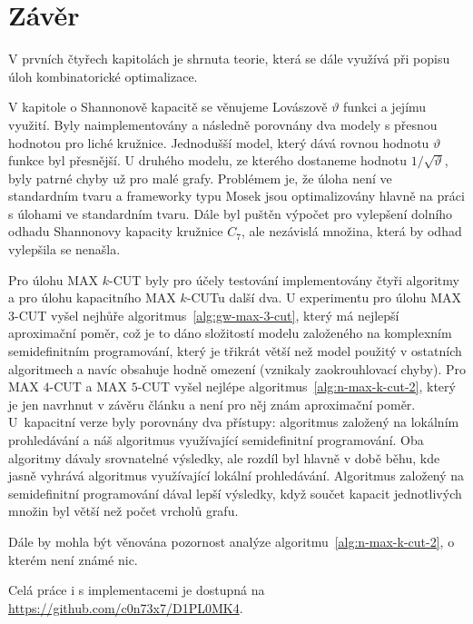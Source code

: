 \chapter*{Závěr}

V prvních čtyřech kapitolách je shrnuta teorie, která se dále využívá při popisu úloh kombinatorické optimalizace.

V kapitole o Shannonově kapacitě se věnujeme Lovászově $\vartheta$ funkci a jejímu využití. Byly naimplementovány a následně porovnány dva modely s přesnou hodnotou pro liché kružnice. Jednodušší model, který dává rovnou hodnotu $\vartheta$ funkce byl přesnější. U druhého modelu, ze kterého dostaneme hodnotu $1/\sqrt{\vartheta}$, byly patrné chyby už pro malé grafy. Problémem je, že úloha není ve standardním tvaru a frameworky typu Mosek jsou optimalizovány hlavně na práci s úlohami ve standardním tvaru. Dále byl puštěn výpočet pro vylepšení dolního odhadu Shannonovy kapacity kružnice $C_7$, ale nezávislá množina, která by odhad vylepšila se nenašla.

Pro úlohu MAX $k$-CUT byly pro účely testování implementovány čtyři algoritmy a pro úlohu kapacitního MAX $k$-CUTu další dva. U experimentu pro úlohu MAX $3$-CUT vyšel nejhůře algoritmus~\ref{alg:gw-max-3-cut}, který má nejlepší aproximační poměr, což je to dáno složitostí modelu založeného na komplexním semidefinitním programování, který je třikrát větší než model použitý v ostatních algoritmech a navíc obsahuje hodně omezení (vznikaly zaokrouhlovací chyby). Pro MAX $4$-CUT a MAX $5$-CUT vyšel nejlépe algoritmus~\ref{alg:n-max-k-cut-2}, který je jen navrhnut v závěru článku \cite{newman} a není pro něj znám aproximační poměr. U~kapacitní verze byly porovnány dva přístupy: algoritmus založený na lokálním prohledávání a náš algoritmus využívající semidefinitní programování. Oba algoritmy dávaly srovnatelné výsledky, ale rozdíl byl hlavně v době běhu, kde jasně vyhrává algoritmus využívající lokální prohledávání. Algoritmus založený na semidefinitní programování dával lepší výsledky, když součet kapacit jednotlivých množin byl větší než počet vrcholů grafu. 

Dále by mohla být věnována pozornost analýze algoritmu~\ref{alg:n-max-k-cut-2}, o kterém není známé nic.

Celá práce i s implementacemi je dostupná na \url{https://github.com/c0n73x7/D1PL0MK4}.